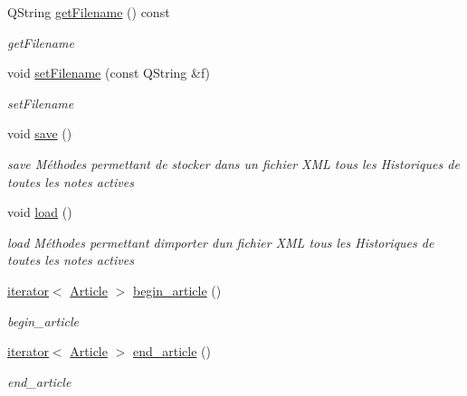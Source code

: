 \begin{DoxyCompactItemize}
Q\+String \hyperlink{class_histo_note_manager_af6bba87ae6f9e99d85535733a2c60af0}{get\+Filename} () const
\begin{DoxyCompactList}\small\item\em get\+Filename \end{DoxyCompactList}\item 
void \hyperlink{class_histo_note_manager_af6598717c840856bb9a10e25a8809a42}{set\+Filename} (const Q\+String \&f)
\begin{DoxyCompactList}\small\item\em set\+Filename \end{DoxyCompactList}\item 
\mbox{\label{class_histo_note_manager_a37c344454caa435754cfcc209562e5ad}} 
void \hyperlink{class_histo_note_manager_a37c344454caa435754cfcc209562e5ad}{save} ()
\begin{DoxyCompactList}\small\item\em save Méthodes permettant de stocker dans un fichier X\+ML tous les Historiques de toutes les notes actives \end{DoxyCompactList}\item 
\mbox{\label{class_histo_note_manager_ae49822e66395d56926edbe361d2812c2}} 
void \hyperlink{class_histo_note_manager_ae49822e66395d56926edbe361d2812c2}{load} ()
\begin{DoxyCompactList}\small\item\em load Méthodes permettant d\textquotesingle{}importer d\textquotesingle{}un fichier X\+ML tous les Historiques de toutes les notes actives \end{DoxyCompactList}\item 
\hyperlink{class_histo_note_manager_1_1iterator}{iterator}$<$ \hyperlink{class_article}{Article} $>$ \hyperlink{class_histo_note_manager_aafcbf8113a0a5ede08c8d65da2655c33}{begin\+\_\+article} ()
\begin{DoxyCompactList}\small\item\em begin\+\_\+article \end{DoxyCompactList}\item 
\hyperlink{class_histo_note_manager_1_1iterator}{iterator}$<$ \hyperlink{class_article}{Article} $>$ \hyperlink{class_histo_note_manager_a6b3bf215eb0e27eaa7affa9824dd5785}{end\+\_\+article} ()
\begin{DoxyCompactList}\small\item\em end\+\_\+article \end{DoxyCompactList}\item 

\end{DoxyCompactItemize}
